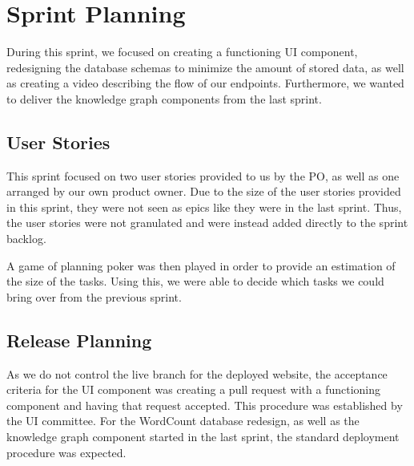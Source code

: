 \section{Sprint Planning}
During this sprint, we focused on creating a functioning UI component, redesigning the database schemas to minimize the amount of stored data, as well as creating a video describing the flow of our endpoints. Furthermore, we wanted to deliver the knowledge graph components from the last sprint. 

\subsection*{User Stories}
This sprint focused on two user stories provided to us by the \knox{} PO, as well as one arranged by our own product owner. 
Due to the size of the user stories provided in this sprint, they were not seen as epics like they were in the last sprint. Thus, the user stories were not granulated and were instead added directly to the sprint backlog.  


A game of planning poker was then played in order to provide an estimation of the size of the tasks. 
Using this, we were able to decide which tasks we could bring over from the previous sprint.

\subsection*{Release Planning}
As we do not control the live branch for the deployed \knox{} website, the acceptance criteria for the UI component was creating a pull request with a functioning component and having that request accepted.
This procedure was established by the UI committee. 
For the WordCount database redesign, as well as the knowledge graph component started in the last sprint, the standard deployment procedure was expected. 